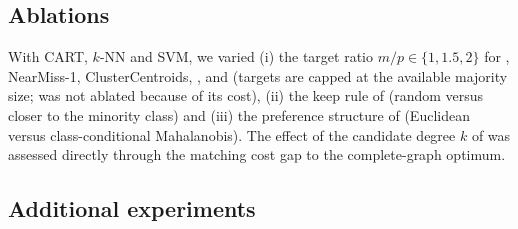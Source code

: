 \subsection{Ablations}\label{sec:design:ablations}

With CART, $k$-NN and SVM, we varied (i) the target ratio $m/p\in\{1,1.5,2\}$ for \RUS, NearMiss-1, ClusterCentroids, \MUSBS, \MUSBO{} and \MUSCS{} (targets are capped at the available majority size; \MUSCO{} was not ablated because of its cost), (ii) the keep rule of \MUSCS{} (random versus closer to the minority class) and (iii) the preference structure of \MUSBS{} (Euclidean versus class-conditional Mahalanobis). The effect of the candidate degree $k$ of \MUSCO{} was assessed directly through the matching cost gap to the complete-graph optimum.

\subsection{Additional experiments}\label{sec:design:revision}


